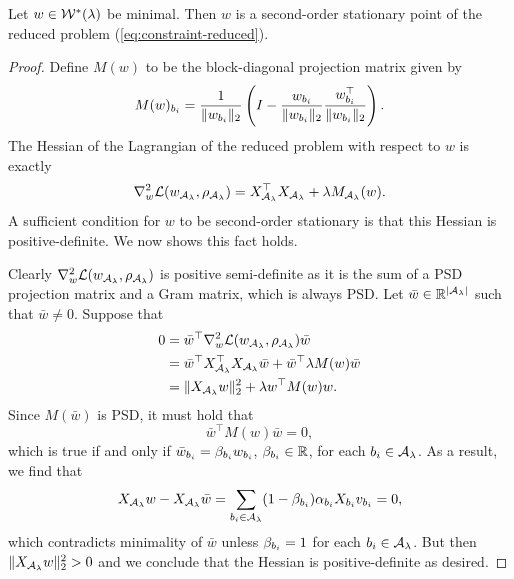 \begin{lemma}\label{lemma:second-order-stationary}
	Let \( w \in \mathcal{W}^*(\lambda) \) be minimal.
	Then \( w \) is a second-order stationary point of the reduced problem
	(\cref{eq:constraint-reduced}).
\end{lemma}
\begin{proof}
	Define \( M(w) \) to be the block-diagonal projection matrix given by
	\begin{equation}\label{eq:projection-matrix-block}
		M(w)_{b_i}
		= \frac{1}{\|w_{b_i}\|_2} \left(I - \frac{w_{b_i}}{\|w_{b_i}\|_2}\frac{w_{b_i}^\top}{\|w_{b_i}\|_2}\right).
	\end{equation}
	The Hessian of the Lagrangian of the reduced problem with respect to
	\( w \) is exactly
	\[
		\nabla^2_w \mathcal{L}(w_{\mathcal{A}_{\lambda}}, \rho_{{\mathcal{A}_{\lambda}}}) =
		X_{\mathcal{A}_{\lambda}}^\top X_{\mathcal{A}_{\lambda}} + \lambda M_{\mathcal{A}_{\lambda}}(w).
	\]
	A sufficient condition for \( w \) to be second-order stationary is
	that this Hessian is positive-definite.
	We now shows this fact holds.

	Clearly \( \nabla^2_w \mathcal{L}(w_{\mathcal{A}_{\lambda}}, \rho_{{\mathcal{A}_{\lambda}}}) \) is positive semi-definite
	as it is the sum of a PSD projection matrix
	and a Gram matrix, which is always PSD.
	Let \( \bar w \in \mathbb{R}^{|{\mathcal{A}_{\lambda}}|} \) such that \( \bar w \neq 0 \).
	Suppose that
	\begin{align*}
		0
		 & = \bar w^\top \nabla^2_w \mathcal{L}(w_{\mathcal{A}_{\lambda}}, \rho_{{\mathcal{A}_{\lambda}}}) \bar w                    \\
		 & = \bar w^\top X_{\mathcal{A}_{\lambda}}^\top X_{\mathcal{A}_{\lambda}} \bar w + \bar w^\top\lambda M(w) \bar w \\
		 & = \|X_{\mathcal{A}_{\lambda}} w\|_2^2 + \lambda w^\top M(w) w.
	\end{align*}
	Since \( M(\bar w) \) is PSD,
	it must hold that
	\[
		\bar w^\top M(w) \bar w = 0,
	\]
	which is true if and only if \( \bar{w}_{b_i} = \beta_{b_i} w_{b_i} \),
	\( \beta_{b_i} \in \mathbb{R} \), for each \( {b_i} \in {\mathcal{A}_{\lambda}} \).
	As a result, we find that
	\[
		X_{\mathcal{A}_{\lambda}} w - X_{\mathcal{A}_{\lambda}} \bar w = \sum_{{b_i} \in {\mathcal{A}_{\lambda}}} (1 - \beta_{b_i}) \alpha_{{b_i}} X_{b_i} v_{b_i} = 0,
	\]
	which contradicts minimality of \( \bar w \) unless \( \beta_{{b_i}} = 1 \)
    for each \( {b_i} \in {\mathcal{A}_{\lambda}} \).
	But then \( \|X_{\mathcal{A}_{\lambda}} w\|_2^2 > 0 \) and
	we conclude that the Hessian is positive-definite as desired.
\end{proof}

